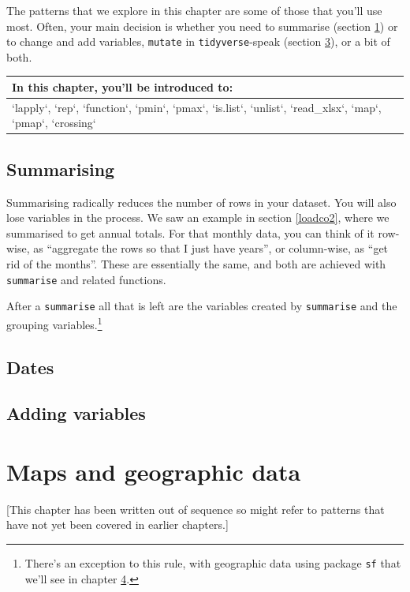 \documentclass[
]{book}
\begin{document}
The patterns that we explore in this chapter are some of those that you'll use most. Often, your main decision is whether you need to summarise (section \ref{summarise}) or to change and add variables, \texttt{mutate} in \texttt{tidyverse}-speak (section \ref{mutate}), or a bit of both.

\begin{tabular}{l}
\hline
In this chapter, you'll be introduced to:\\
\hline
`lapply`, `rep`, `function`, `pmin`, `pmax`, `is.list`, `unlist`, `read\_xlsx`, `map`, `pmap`, `crossing`\\
\hline
\end{tabular}

\hypertarget{summarise}{%
\section{Summarising}\label{summarise}}

Summarising radically reduces the number of rows in your dataset. You will also lose variables in the process. We saw an example in section \ref{loadco2}, where we summarised to get annual totals. For that monthly data, you can think of it row-wise, as ``aggregate the rows so that I just have years'', or column-wise, as ``get rid of the months''. These are essentially the same, and both are achieved with \texttt{summarise} and related functions.

After a \texttt{summarise} all that is left are the variables created by \texttt{summarise} and the grouping variables.\footnote{There's an exception to this rule, with geographic data using package \texttt{sf} that we'll see in chapter \ref{maps}.}

\hypertarget{dates}{%
\section{Dates}\label{dates}}

\hypertarget{mutate}{%
\section{Adding variables}\label{mutate}}

\hypertarget{maps}{%
\chapter{Maps and geographic data}\label{maps}}

{[}This chapter has been written out of sequence so might refer to patterns that have not yet been covered in earlier chapters.{]}
\end{document}
